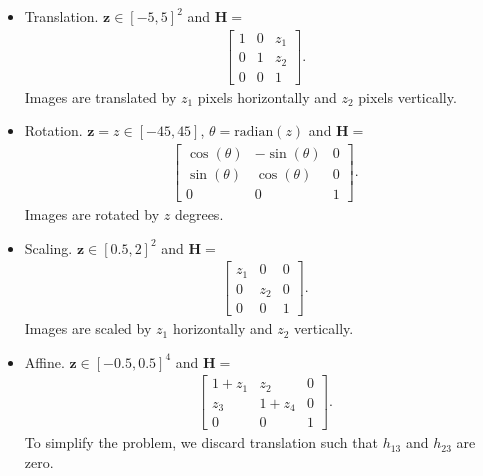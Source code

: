 \documentclass[conference]{IEEEtran}
\begin{document}
\begin{itemize}
\vspace{0.5cm}
\item Translation. 
$\mathbf{z} \in [-5,5]^2$ and $\mathbf{H}=$
\begin{align*} 
\begin{bmatrix} 
1 & 0 & z_1 \\
0 & 1 & z_2 \\
0 & 0 & 1
\end{bmatrix}.
\end{align*}
Images are translated by $z_1$ pixels horizontally and $z_2$ pixels vertically. 

\vspace{0.5cm}
\item Rotation. $\mathbf{z} = z \in [-45,45]$, $\theta = \text{radian}(z)$ and $\mathbf{H}=$
\begin{align*}
\begin{bmatrix} 
\cos(\theta) & -\sin(\theta) & 0 \\
\sin(\theta) & \cos(\theta)  & 0 \\
0 & 0 & 1
\end{bmatrix}.
\end{align*}
Images are rotated by $z$ degrees. 

\vspace{0.5cm}
\item Scaling. 
$\mathbf{z} \in [0.5,2]^2$ and  $\mathbf{H}=$
\begin{align*}
\begin{bmatrix} 
z_1 & 0 & 0 \\
0 & z_2  & 0 \\
0 & 0 & 1
\end{bmatrix}.
\end{align*}
Images are scaled by $z_1$ horizontally and $z_2$ vertically. 

\vspace{0.5cm}
\item Affine. 
$\mathbf{z} \in [-0.5,0.5]^4$ and $\mathbf{H}=$
\begin{align*}
\begin{bmatrix} 
1 + z_1 & z_2      & 0 \\
z_3     & 1 + z_4  & 0 \\
0 & 0 & 1
\end{bmatrix}.
\end{align*}
To simplify the problem, we discard translation such that $h_{13}$ and $h_{23}$ are zero.


\end{itemize}
\end{document}
